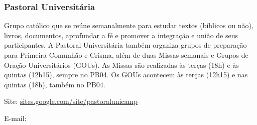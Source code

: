 \subsubsection*{Pastoral Universitária}

Grupo católico que se reúne semanalmente para estudar textos (bíblicos ou não),
livros, documentos, aprofundar a fé e promover a integração e união de seus
participantes. A Pastoral Universitária também organiza grupos de preparação
para Primeira Comunhão e Crisma, além de duas Missas semanais e Grupos de Oração
Universitários (GOUs). As Missas são realizadas às terças (18h) e às quintas
(12h15), sempre no PB04. Os GOUs acontecem às terças (12h15) e nas quintas
(18h), também no PB04.

\begin{compactitemize}
    \item Site: \url{sites.google.com/site/pastoralunicamp}
    \item E-mail: 
\end{compactitemize}
